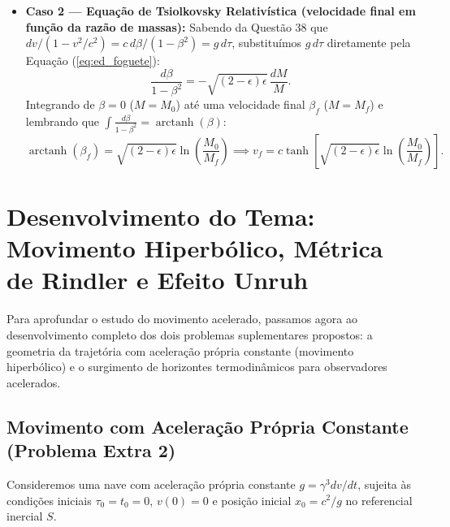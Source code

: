 \documentclass[11pt, a4paper]{article}
\begin{document}
\begin{enumerate}[label=\alph*)]
\begin{itemize}
        \item \textbf{Caso 2 — Equação de Tsiolkovsky Relativística (velocidade final em função da razão de massas):} Sabendo da Questão 38 que $dv / (1 - v^2/c^2) = c \, d\beta / (1 - \beta^2) = g \, d\tau$, substituímos $g \, d\tau$ diretamente pela Equação (\ref{eq:ed_foguete}):
        \begin{equation}
        \frac{d\beta}{1 - \beta^2} = -\sqrt{(2 - \epsilon)\epsilon} \, \frac{dM}{M}.
        \end{equation}
        Integrando de $\beta = 0$ ($M = M_0$) até uma velocidade final $\beta_f$ ($M = M_f$) e lembrando que $\int \frac{d\beta}{1-\beta^2} = \operatorname{arctanh}(\beta)$:
        \begin{equation}
        \operatorname{arctanh}(\beta_f) = \sqrt{(2 - \epsilon)\epsilon} \ln\left(\frac{M_0}{M_f}\right) \implies v_f = c \tanh\left[ \sqrt{(2 - \epsilon)\epsilon} \ln\left(\frac{M_0}{M_f}\right) \right].
        \end{equation}
    \end{itemize}
\end{enumerate}

\section{Desenvolvimento do Tema: Movimento Hiperbólico, Métrica de Rindler e Efeito Unruh}

Para aprofundar o estudo do movimento acelerado, passamos agora ao desenvolvimento completo dos dois problemas suplementares propostos: a geometria da trajetória com aceleração própria constante (movimento hiperbólico) e o surgimento de horizontes termodinâmicos para observadores acelerados.

\subsection{Movimento com Aceleração Própria Constante (Problema Extra 2)}

Consideremos uma nave com aceleração própria constante $g = \gamma^3 dv/dt$, sujeita às condições iniciais $\tau_0 = t_0 = 0$, $v(0) = 0$ e posição inicial $x_0 = c^2/g$ no referencial inercial $S$.
\end{document}
